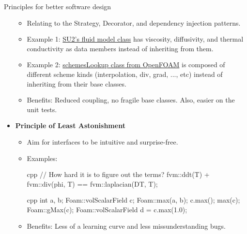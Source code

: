 \begin{frame}{Principles for better software design}
\begin{itemize}
\begin{itemize}
        \item Relating to the Strategy, Decorator, and dependency injection patterns.
        \item Example 1:
            \href{https://github.com/su2code/SU2/blob/master/SU2_CFD/include/fluid/CFluidModel.hpp}{SU2's fluid model class}
            has viscosity, diffusivity, and thermal conductivity as data members instead of inheriting from them.
        \item Example 2:
            \href{https://develop.openfoam.com/Development/openfoam/-/blob/OpenFOAM-v2312/src/OpenFOAM/matrices/schemes/schemesLookup.H}{schemesLookup class from OpenFOAM}
            is composed of different scheme kinds (interpolation, div, grad, ..., etc)
            instead of inheriting from their base classes.
        \item Benefits: Reduced coupling, no fragile base classes. Also, easier on the unit tests.
    \end{itemize}
    \pagebreak
    \item \textbf{Principle of Least Astonishment}
    \begin{itemize}
        \item Aim for interfaces to be intuitive and surprise-free.
        \item Examples:
\begin{CodeEnvNoComment}{cpp}{\scriptsize}
// How hard it is to figure out the terms?
fvm::ddt(T) + fvm::div(phi, T) == fvm::laplacian(DT, T);
\end{CodeEnvNoComment}
\begin{CodeEnvNoComment}{cpp}{\scriptsize}
int a, b; Foam::volScalarField c;
Foam::max(a, b);
c.max(); max(c); Foam::gMax(c);
Foam::volScalarField d = c.max(1.0);
\end{CodeEnvNoComment}
        \item Benefits: Less of a learning curve and less missunderstanding bugs.
    \end{itemize}
\end{itemize}


\end{frame}
